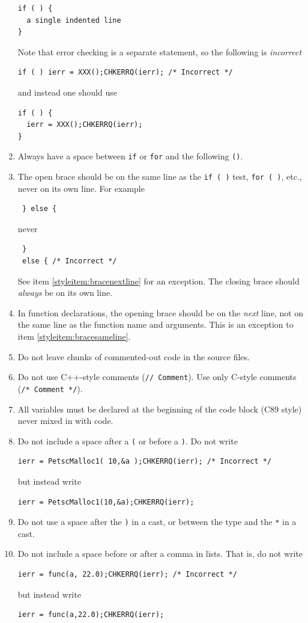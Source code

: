 \begin{enumerate}
\begin{lstlisting}
if ( ) {
  a single indented line
}
\end{lstlisting}
Note that error checking is a separate statement, so the following is {\em incorrect}
\begin{lstlisting}
if ( ) ierr = XXX();CHKERRQ(ierr); /* Incorrect */
\end{lstlisting}
and instead one should use
\begin{lstlisting}
if ( ) {
  ierr = XXX();CHKERRQ(ierr);
}
\end{lstlisting}
\item Always have a space between \lstinline{if} or \lstinline{for} and the following \lstinline{()}.
\item \label{styleitem:bracesameline} The open brace should be on the same line as the \lstinline{if ( )} test, \lstinline{for ( )}, etc., never on its own line.  For example
\begin{lstlisting}
 } else {
\end{lstlisting}
never
\begin{lstlisting}
 }
 else { /* Incorrect */
\end{lstlisting}
See item \ref{styleitem:bracenextline} for an exception.
 The closing brace should {\em always} be on its own line.
\item \label{styleitem:bracenextline} In function declarations, the opening brace should be on the {\em next} line, not on the same line as the function name and arguments. 
  This is an exception to item \ref{styleitem:bracesameline}. 
\item Do not leave chunks of commented-out code in the source files.
\item Do not use C++-style comments (\lstinline{// Comment}). Use only C-style comments (\lstinline{/* Comment */}).
\item All variables must be declared at the beginning of the code block (C89 style) never mixed in with code.
\item Do not include a space after a \lstinline{(} or before a \lstinline{)}. Do not write
\begin{lstlisting}
ierr = PetscMalloc1( 10,&a );CHKERRQ(ierr); /* Incorrect */
\end{lstlisting}
but instead write
\begin{lstlisting}
ierr = PetscMalloc1(10,&a);CHKERRQ(ierr);
\end{lstlisting}
\item Do not use a space after the \lstinline{)} in a cast, or between the type and the \lstinline{*} in a cast.
\item Do not include a  space before or after a comma in lists.
That is, do not write
\begin{lstlisting}
ierr = func(a, 22.0);CHKERRQ(ierr); /* Incorrect */
\end{lstlisting}
but instead write
\begin{lstlisting}
ierr = func(a,22.0);CHKERRQ(ierr);
\end{lstlisting}
\end{enumerate}

